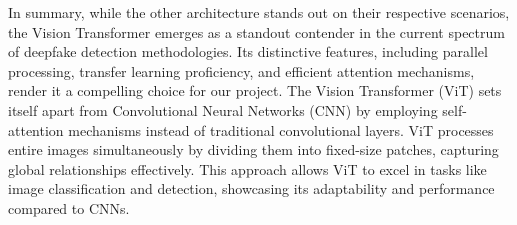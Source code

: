 \noindent In summary, while the other architecture stands out on their respective scenarios, the Vision Transformer emerges as a standout contender in the current spectrum of deepfake detection methodologies. Its distinctive features, including parallel processing, transfer learning proficiency, and efficient attention mechanisms, render it a compelling choice for our project. The Vision Transformer (ViT) sets itself apart from Convolutional Neural Networks (CNN) by employing self-attention mechanisms instead of traditional convolutional layers. ViT processes entire images simultaneously by dividing them into fixed-size patches, capturing global relationships effectively. This approach allows ViT to excel in tasks like image classification and detection, showcasing its adaptability and performance compared to CNNs.
